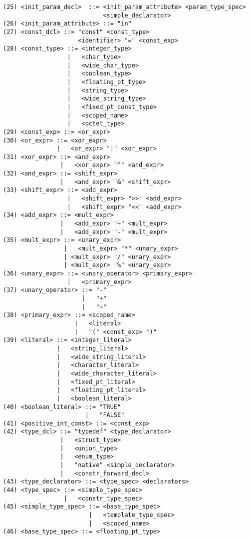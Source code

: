 \begin{verbatim}
(25) <init_param_decl>  ::= <init_param_attribute> <param_type_spec> 
                            <simple_declarator>
(26) <init_param_attribute> ::= "in" 
(27) <const_dcl> ::= "const" <const_type> 
                     <identifier> "=" <const_exp>
(28) <const_type> ::= <integer_type>
                  |   <char_type> 
                  |   <wide_char_type> 
                  |   <boolean_type> 
                  |   <floating_pt_type> 
                  |   <string_type> 
                  |   <wide_string_type> 
                  |   <fixed_pt_const_type> 
                  |   <scoped_name> 
                  |   <octet_type>
(29) <const_exp> ::= <or_expr> 
(30) <or_expr> ::= <xor_expr>
               |   <or_expr> "|" <xor_expr>
(31) <xor_expr> ::= <and_expr>
                |   <xor_expr> "^" <and_expr>
(32) <and_expr> ::= <shift_expr>
                |   <and_expr> "&" <shift_expr>
(33) <shift_expr> ::= <add_expr>
                  |   <shift_expr> ">>" <add_expr> 
                  |   <shift_expr> "<<" <add_expr>
(34) <add_expr> ::= <mult_expr>
                |   <add_expr> "+" <mult_expr> 
                |   <add_expr> "-" <mult_expr>
(35) <mult_expr> ::= <unary_expr>
                 |   <mult_expr> "*" <unary_expr> 
                 | <mult_expr> "/" <unary_expr> 
                 | <mult_expr> "%" <unary_expr>
(36) <unary_expr> ::= <unary_operator> <primary_expr>
                  |   <primary_expr>
(37) <unary_operator> ::= "-"
                      |   "+" 
                      |   "~"
(38) <primary_expr> ::= <scoped_name>
                    |   <literal> 
                    |   "(" <const_exp> ")"
(39) <literal> ::= <integer_literal>
               |   <string_literal> 
               |   <wide_string_literal> 
               |   <character_literal> 
               |   <wide_character_literal> 
               |   <fixed_pt_literal> 
               |   <floating_pt_literal> 
               |   <boolean_literal>
(40) <boolean_literal> ::= "TRUE"
                       |   "FALSE"
(41) <positive_int_const> ::= <const_exp> 
(42) <type_dcl> ::= "typedef" <type_declarator>
                |   <struct_type> 
                |   <union_type>
                |   <enum_type> 
                |   "native" <simple_declarator> 
                |   <constr_forward_decl>
(43) <type_declarator> ::= <type_spec> <declarators> 
(44) <type_spec> ::= <simple_type_spec>
                 |   <constr_type_spec>
(45) <simple_type_spec> ::= <base_type_spec>
                        |   <template_type_spec> 
                        |   <scoped_name>
(46) <base_type_spec> ::= <floating_pt_type>

\end{verbatim}
